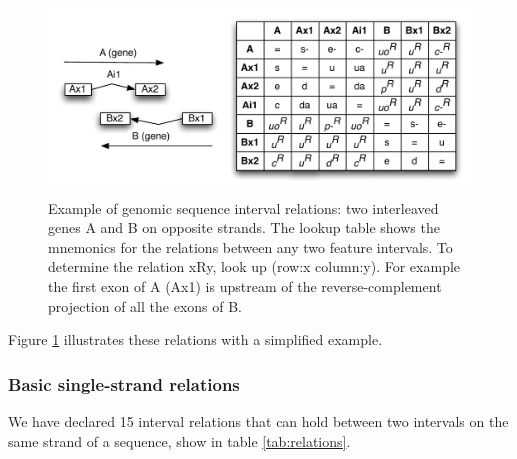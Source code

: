 \documentclass{article}
\begin{document}
\begin{figure}
\center
\includegraphics[height=5cm]{relations-examples}
\caption{Example of genomic sequence interval relations: two
  interleaved genes A and B on opposite strands. The lookup table
  shows the mnemonics for the relations between any two feature
  intervals. To determine the relation xRy, look up (row:x
  column:y). For example the first exon of A (Ax1) is upstream of the
  reverse-complement projection of all the exons of B.}
\label{fig:relations-examples}
\end{figure}

Figure \ref{fig:relations-examples} illustrates these relations with a
simplified example.

\subsubsection{Basic single-strand relations}

We have declared 15 interval relations that can hold between two intervals on the same strand of a sequence, show in table
\ref{tab:relations}. 
\end{document}
